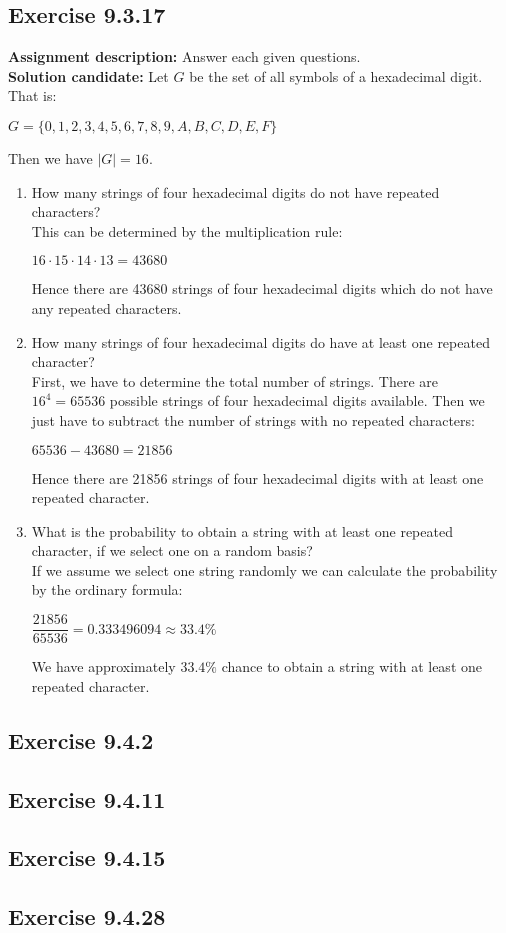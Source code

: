 \documentclass{report}
\newcommand{\cent}[1]{\begin{center}#1\end{center}}
\newcommand{\assignmentDescription}{\textbf{Assignment description: }}
\newcommand{\solution}{\textbf{Solution candidate: }}
\newcommand{\Exercise}[1]{\subsection{Exercise #1}}
\newcommand{\defaultEnumerateLabel}{\textbf{\alph*.}}
\newcommand{\myItem}[1]{\item #1\\}
\newcommand{\letterEnumeration}[1]{\begin{enumerate}[label = \defaultEnumerateLabel]
		#1
\end{enumerate}}
\begin{document}
 	\Exercise{9.3.17}
 	
 	\assignmentDescription
 	Answer each given questions.\\
 	
 	\solution
 	Let $G$ be the set of all symbols of a hexadecimal digit. That is:
 	
 	\cent{$G = \{0,1,2,3,4,5,6,7,8,9,A,B,C,D,E,F\}$}
 	
 	Then we have $|G| = 16$.\\
 	
 	\letterEnumeration{
 		\myItem{How many strings of four hexadecimal digits do not have repeated characters?}
		
		This can be determined by the multiplication rule:
		 		
 		$16 \cdot 15 \cdot 14 \cdot 13 = 43680$
 		
 		Hence there are 43680 strings of four hexadecimal digits which do not have any repeated characters.\\
 		
 		\myItem{How many strings of four hexadecimal digits do have at least one repeated character?}
 		
 		First, we have to determine the total number of strings. There are $16^4 = 65536$  possible strings of four hexadecimal digits available. Then we just have to subtract the number of strings with no repeated characters:
 		
 		\cent{$65536 - 43680 = 21856$}
 		
 		Hence there are 21856 strings of four hexadecimal digits with at least one repeated character.\\
 		
 		\myItem{What is the probability to obtain a string with at least one repeated character, if we select one on  a random basis?}
 		
 		If we assume we select one string randomly we can calculate the probability by the ordinary formula:
 		
 		\cent{$\dfrac{21856}{65536} = 0.333496094 \approx 33.4\%$}
 		
 		We have approximately $33.4 \%$ chance to obtain a string with at least one repeated character.\\
 		
 	}
 	\Exercise{9.4.2}
 	
 	\Exercise{9.4.11}
 	
 	\Exercise{9.4.15}
 	
 	\Exercise{9.4.28}
 	
\end{document}
